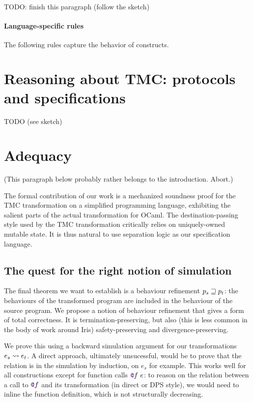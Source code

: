 TODO: finish this paragraph (follow the sketch)


\paragraph{Language-specific rules} The following rules capture the behavior of \LambdaLang constructs.






\section{Reasoning about TMC: protocols and specifications}
\label{sec:TMC_protocols_and_specs}

TODO (see sketch)

\section{Adequacy}
\label{sec:soundness}
\label{sec:adequacy}

(This paragraph below probably rather belongs to the introduction. Abort.)

The formal contribution of our work is a mechanized soundness proof for the TMC transformation on a simplified programming language, exhibiting the salient parts of the actual transformation for OCaml.
%
The destination-passing style used by the TMC transformation critically relies on uniquely-owned mutable state.
%
It is thus natural to use separation logic as our specification language.

\subsection{The quest for the right notion of simulation}
\label{sec:howto-relation}

The final theorem we want to establish is a behaviour refinement $p_s \sqsupseteq p_t$: the behaviours of the transformed program are included in the behaviour of the source program.
%
We propose a notion of behaviour refinement that gives a form of total correctness.
%
It is termination-preserving, but also (this is less common in the body of work around Iris) safety-preserving and divergence-preserving.

We prove this using a backward simulation argument for our transformations $e_s \rightsquigarrow e_t$.
%
A direct approach, ultimately unsucessful, would be to prove that the relation is in the simulation by induction, on $e_s$ for example.
%
This works well for all constructions except for function calls $\lambdCall{\lambdFunc{f}}{e}$: to reason on the relation between a call to $\lambdFunc{f}$ and its transformation (in direct or DPS style), we would need to inline the function definition, which is not structurally decreasing.

